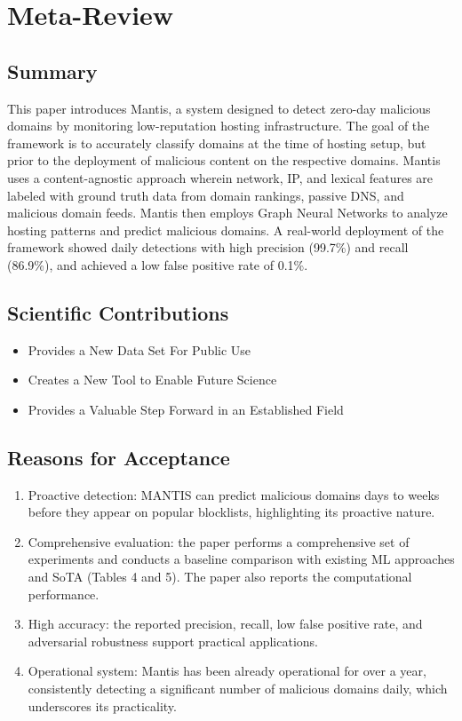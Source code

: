 \newpage

\section{Meta-Review}
\subsection{Summary}
This paper introduces Mantis, a system designed to detect zero-day malicious domains by monitoring low-reputation hosting infrastructure.  The goal of the framework is to accurately classify domains at the time of hosting setup, but prior to the deployment of malicious content on the respective domains. Mantis uses a content-agnostic approach wherein network, IP, and lexical features are labeled with ground truth data from domain rankings, passive DNS, and malicious domain feeds. Mantis then employs Graph Neural Networks to analyze hosting patterns and predict malicious domains. A real-world deployment of the framework showed daily detections with high precision (99.7\%) and recall (86.9\%), and achieved a low false positive rate of 0.1\%. 


\subsection{Scientific Contributions}
\begin{itemize}
\item Provides a New Data Set For Public Use
\item Creates a New Tool to Enable Future Science
\item Provides a Valuable Step Forward in an Established Field
\end{itemize}

\subsection{Reasons for Acceptance}
\begin{enumerate}

\item Proactive detection: MANTIS can predict malicious domains days to weeks before they appear on popular blocklists, highlighting its proactive nature.
\item Comprehensive evaluation: the paper performs a comprehensive set of experiments and conducts a baseline comparison with existing ML approaches and SoTA (Tables 4 and 5). The paper also reports the computational performance.
\item High accuracy: the reported precision, recall, low false positive rate, and adversarial robustness support practical applications.
\item Operational system: Mantis has been already operational for over a year, consistently detecting a significant number of malicious domains daily, which underscores its practicality.
\end{enumerate}

